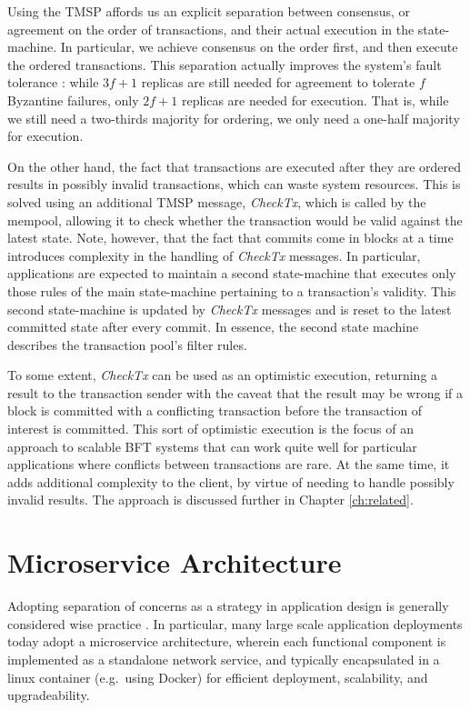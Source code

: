 Using the TMSP affords us an explicit separation between consensus, or agreement on the order of transactions, 
and their actual execution in the state-machine.
In particular, we achieve consensus on the order first, and then execute the ordered transactions.
This separation actually improves the system's fault tolerance \cite{yin2003separating}:
while $3f+1$ replicas are still needed for agreement to tolerate $f$ Byzantine failures, 
only $2f+1$ replicas are needed for execution.
That is, while we still need a two-thirds majority for ordering, we only need a one-half majority for execution.

On the other hand, the fact that transactions are executed after they are ordered results in possibly invalid transactions,
which can waste system resources. 
This is solved using an additional TMSP message, \emph{CheckTx}, which is called by the mempool,
allowing it to check whether the transaction would be valid against the latest state.
Note, however, that the fact that commits come in blocks at a time introduces complexity in the handling of \emph{CheckTx} messages.
In particular, applications are expected to maintain a second state-machine that executes only those rules of the main state-machine pertaining to a transaction's validity. 
This second state-machine is updated by \emph{CheckTx} messages and is reset to the latest committed state after every commit.
In essence, the second state machine describes the transaction pool's filter rules.

To some extent, \emph{CheckTx} can be used as an optimistic execution, 
returning a result to the transaction sender with the caveat that 
the result may be wrong if a block is committed with a conflicting transaction
before the transaction of interest is committed.
This sort of optimistic execution is the focus of an approach to scalable BFT systems 
that can work quite well for particular applications where conflicts between transactions are rare. 
At the same time, it adds additional complexity to the client, by virtue of needing to handle possibly invalid results.
The approach is discussed further in Chapter \ref{ch:related}.

\section{Microservice Architecture}

Adopting separation of concerns as a strategy in application design is generally considered wise practice \cite{hursch1995separation}.
In particular, many large scale application deployments today adopt a microservice architecture,
wherein each functional component is implemented as a standalone network service, 
and typically encapsulated in a linux container (e.g.~using Docker) for efficient deployment, scalability, and upgradeability.

